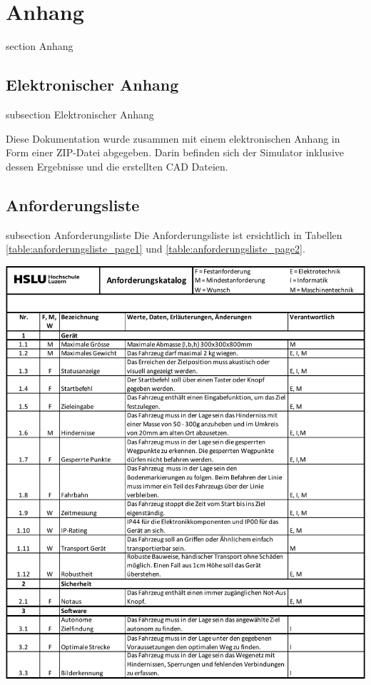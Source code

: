 \newpage

\section*{Anhang}
    {section}
    {Anhang}

\subsection*{Elektronischer Anhang}\label{elect-anhang}
{subsection}
{Elektronischer Anhang}

Diese Dokumentation wurde zusammen mit einem elektronischen Anhang in Form einer ZIP-Datei abgegeben. Darin befinden sich der Simulator inklusive dessen Ergebnisse und die erstellten CAD Dateien.
    
\subsection*{Anforderungsliste}\label{anforderungliste}
    {subsection}
    {Anforderungsliste}
Die  Anforderungsliste ist ersichtlich in Tabellen \ref{table:anforderungsliste_page1} und \ref{table:anforderungsliste_page2}.

\begin{table}[H]
\centering
\includegraphics[width=\textwidth]{assets/Anforderungsliste_V1.01_page1.pdf}
\caption{Anforderungsliste Teil 1}
\label{table:anforderungsliste_page1}
\end{table}
\newpage

